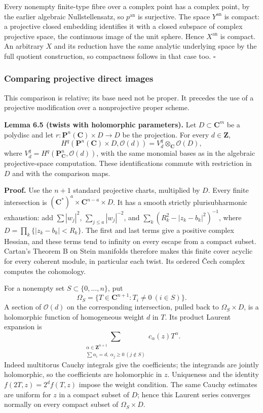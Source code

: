 \documentclass[11pt]{article}
\begin{document}
Every nonempty finite-type fibre over a complex point has a complex
point, by the earlier algebraic Nullstellensatz, so \(p^{\mathrm{an}}\)
is surjective. The space \(Y^{\mathrm{an}}\) is compact: a projective
closed embedding identifies it with a closed subspace of complex
projective space, the continuous image of the unit sphere. Hence
\(X^{\mathrm{an}}\) is compact. An arbitrary \(X\) and its reduction
have the same analytic underlying space by the full quotient
construction, so compactness follows in that case too. \(\square\)

\subsubsection{Comparing projective direct
images}\label{comparing-projective-direct-images}

This comparison is relative; its base need not be proper. It precedes
the use of a projective modification over a nonprojective proper scheme.

\textbf{Lemma 6.5 (twists with holomorphic parameters).} Let
\(D\subset\mathbf C^m\) be a polydisc and let
\(r:\mathbf P^n(\mathbf C)\times D\to D\) be the projection. For every
\(d\in\mathbf Z\), \[
H^q(\mathbf P^n(\mathbf C)\times D,\mathcal O(d))
=V_d^q\otimes_{\mathbf C}\mathcal O(D),
\tag{7}
\] where \(V_d^q=H^q(\mathbf P^n_{\mathbf C},\mathcal O(d))\), with the
same monomial bases as in the algebraic projective-space computation.
These identifications commute with restriction in \(D\) and with the
comparison maps.

\textbf{Proof.} Use the \(n+1\) standard projective charts, multiplied
by \(D\). Every finite intersection is
\((\mathbf C^*)^a\times\mathbf C^{n-a}\times D\). It has a smooth
strictly plurisubharmonic exhaustion: add \(\sum|w_j|^2\),
\(\sum_{j\le a}|w_j|^{-2}\), and \(\sum_k(R_k^2-|z_k-b_k|^2)^{-1}\),
where \(D=\prod_k\{|z_k-b_k|<R_k\}\). The first and last terms give a
positive complex Hessian, and these terms tend to infinity on every
escape from a compact subset. Cartan's Theorem B on Stein manifolds
therefore makes this finite cover acyclic for every coherent module, in
particular each twist. Its ordered Čech complex computes the cohomology.

For a nonempty set \(S\subset\{0,\ldots,n\}\), put \[
\Omega_S=\{T\in\mathbf C^{n+1}:T_i\ne0\ (i\in S)\}.
\] A section of \(\mathcal O(d)\) on the corresponding intersection,
pulled back to \(\Omega_S\times D\), is a holomorphic function of
homogeneous weight \(d\) in \(T\). Its product Laurent expansion is \[
\sum_{\substack{\alpha\in\mathbf Z^{n+1}\\
\sum\alpha_i=d,\ \alpha_j\ge0\ (j\notin S)}}
c_\alpha(z)T^\alpha .
\tag{8}
\] Indeed multitorus Cauchy integrals give the coefficients; the
integrands are jointly holomorphic, so the coefficients are holomorphic
in \(z\). Uniqueness and the identity \(f(2T,z)=2^df(T,z)\) impose the
weight condition. The same Cauchy estimates are uniform for \(z\) in a
compact subset of \(D\); hence this Laurent series converges normally on
every compact subset of \(\Omega_S\times D\).
\end{document}
